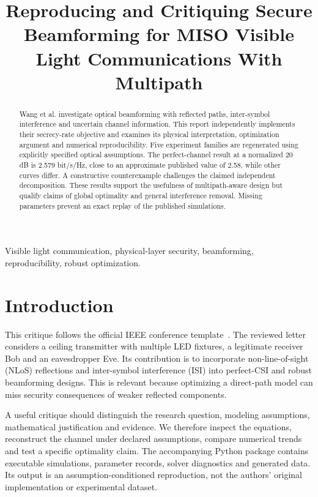 \documentclass[conference]{IEEEtran}
\title{Reproducing and Critiquing Secure Beamforming for MISO Visible Light Communications With Multipath}
\author{\IEEEauthorblockN{Wei Shuwen, Li Su, and Lu Zipeng}
\IEEEauthorblockA{School of Computer Science\\Nanjing University of Information Science and Technology\\Nanjing, China}}
\begin{document}
\maketitle
\begin{abstract}
Wang et al. investigate optical beamforming with reflected paths, inter-symbol interference and uncertain channel information. This report independently implements their secrecy-rate objective and examines its physical interpretation, optimization argument and numerical reproducibility. Five experiment families are regenerated using explicitly specified optical assumptions. The perfect-channel result at a normalized 20 dB is 2.579 bit/s/Hz, close to an approximate published value of 2.58, while other curves differ. A constructive counterexample challenges the claimed independent decomposition. These results support the usefulness of multipath-aware design but qualify claims of global optimality and general interference removal. Missing parameters prevent an exact replay of the published simulations.
\end{abstract}
\begin{IEEEkeywords}
Visible light communication, physical-layer security, beamforming, reproducibility, robust optimization.
\end{IEEEkeywords}

\section{Introduction}
This critique follows the official IEEE conference template~\cite{template}. The reviewed letter~\cite{wang} considers a ceiling transmitter with multiple LED fixtures, a legitimate receiver Bob and an eavesdropper Eve. Its contribution is to incorporate non-line-of-sight (NLoS) reflections and inter-symbol interference (ISI) into perfect-CSI and robust beamforming designs. This is relevant because optimizing a direct-path model can miss security consequences of weaker reflected components.

A useful critique should distinguish the research question, modeling assumptions, mathematical justification and evidence. We therefore inspect the equations, reconstruct the channel under declared assumptions, compare numerical trends and test a specific optimality claim. The accompanying Python package contains executable simulations, parameter records, solver diagnostics and generated data. Its output is an assumption-conditioned reproduction, not the authors' original implementation or experimental dataset.
\end{document}
